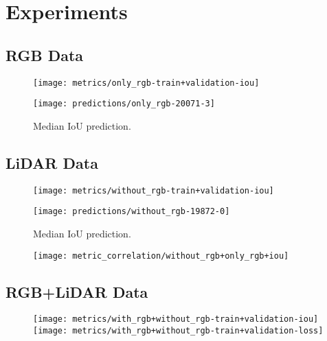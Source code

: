 \section{Experiments}%
\label{sec:experiments}

\subsection{RGB Data}%
\label{sec:rgb-experiment}

\begin{figure}[H]
  \centering
  \texttt{[image: metrics/only\_rgb-train+validation-iou]}
\end{figure}

\begin{figure}[H]
  \centering
  \texttt{[image: predictions/only\_rgb-20071-3]}  %
  \caption{%
    Median IoU prediction.
  }
\end{figure}

\subsection{LiDAR Data}

\begin{figure}[H]
  \centering
  \texttt{[image: metrics/without\_rgb-train+validation-iou]}
\end{figure}

\begin{figure}[H]
  \centering
  \texttt{[image: predictions/without\_rgb-19872-0]}  %
  \caption{%
    Median IoU prediction.
  }
\end{figure}

\begin{figure}[H]
  \centering
  \texttt{[image: metric\_correlation/without\_rgb+only\_rgb+iou]}
\end{figure}

\subsection{RGB+LiDAR Data}

\begin{figure}[H]
  \centering
  \texttt{[image: metrics/with\_rgb+without\_rgb-train+validation-iou]}
  \texttt{[image: metrics/with\_rgb+without\_rgb-train+validation-loss]}
\end{figure}

